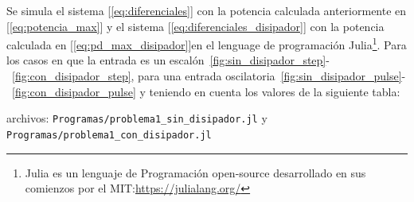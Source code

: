 Se simula el sistema [\ref{eq:diferenciales}] con la potencia calculada anteriormente en [\ref{eq:potencia_max}]  y el sistema [\ref{eq:diferenciales_disipador}] con la potencia calculada en [\ref{eq:pd_max_disipador}]en el lenguage de programación
Julia\footnote{Julia es un lenguaje de Programación open-source desarrollado en sus comienzos por el MIT:\url{https://julialang.org/}}. Para los casos en que la
entrada es un escalón~\ref{fig:sin_disipador_step}-~\ref{fig:con_disipador_step}, para una entrada oscilatoria~\ref{fig:sin_disipador_pulse}-~\ref{fig:con_disipador_pulse} y teniendo en cuenta los valores de la siguiente tabla:

archivos: \verb|Programas/problema1_sin_disipador.jl| y \verb|Programas/problema1_con_disipador.jl|
